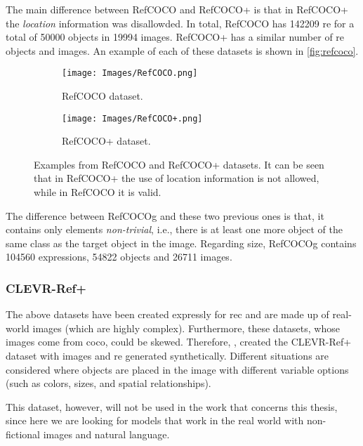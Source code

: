 The main difference between RefCOCO and RefCOCO+ is that in RefCOCO+ the
\emph{location} information was disallowded. In total, RefCOCO has \num{142209}
\gls{re} for a total of \num{50000} objects in \num{19994} images. RefCOCO+ has
a similar number of \gls{re} objects and images. An example of each of these
datasets is shown in \vref{fig:refcoco}.

\begin{figure}[ht]
  \centering
  \begin{subfigure}[t]{.45\textwidth}
    \centering
    \caption{RefCOCO dataset.}
    \texttt{[image: Images/RefCOCO.png]}
  \end{subfigure}
  \begin{subfigure}[t]{.45\textwidth}
    \centering
    \caption{RefCOCO+ dataset.}
    \texttt{[image: Images/RefCOCO+.png]}
  \end{subfigure}
  \caption[Examples from RefCOCO and RefCOCO+ datasets]{Examples from RefCOCO
    and RefCOCO+ datasets. It can be seen that in RefCOCO+ the use of location
    information is not allowed, while in RefCOCO it is valid.}
  \label{fig:refcoco}
\end{figure}

The difference between RefCOCOg and these two previous ones is that, it
contains only elements \emph{non-trivial}, i.e., there is at least one more
object of the same class as the target object in the image. Regarding size,
RefCOCOg contains \num{104560} expressions, \num{54822} objects and \num{26711}
images.

\subsubsection{CLEVR-Ref+}
The above datasets have been created expressly for \gls{rec} and are made up of
real-world images (which are highly complex). Furthermore, these datasets,
whose images come from \gls{coco}, could be skewed. Therefore,
, created the CLEVR-Ref+ dataset with images and \gls{re}
generated synthetically. Different situations are considered where objects are
placed in the image with different variable options (such as colors, sizes, and
spatial relationships).

This dataset, however, will not be used in the work that concerns this thesis,
since here we are looking for models that work in the real world with
non-fictional images and natural language.

